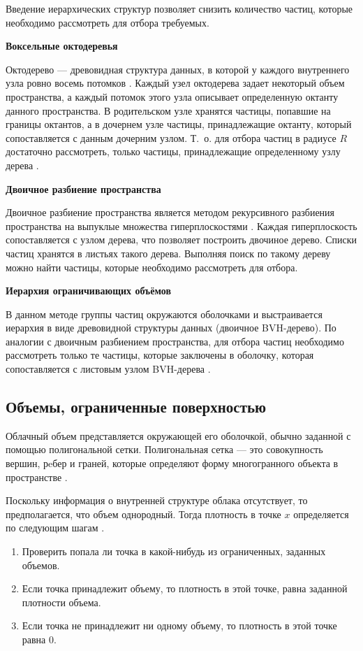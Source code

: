 Введение иерархических структур позволяет снизить количество частиц, которые необходимо рассмотреть для отбора требуемых.


\textbf{Воксельные октодеревья}

Октодерево --- древовидная структура данных, в которой у каждого внутреннего узла ровно восемь потомков \cite{octree}.
Каждый узел октодерева задает некоторый объем пространства, а каждый потомок этого узла описывает определенную октанту данного пространства. 
В родительском узле хранятся частицы, попавшие на границы октантов, а в дочернем узле частицы, принадлежащие октанту, который сопоставляется с данным дочерним узлом. Т.~о. для отбора частиц в радиусе $R$ достаточно рассмотреть, только частицы, принадлежащие определенному узлу дерева \cite{clouds}. 

\textbf{Двоичное разбиение пространства}

Двоичное разбиение пространства является методом рекурсивного разбиения пространства на выпуклые множества гиперплоскостями \cite{neighbours}. Каждая гиперплоскость сопоставляется с узлом дерева, что позволяет построить двочиное дерево. Списки частиц хранятся в листьях такого дерева. Выполняя поиск по такому дереву можно найти частицы, которые необходимо рассмотреть для отбора.

\textbf{Иерархия ограничивающих объёмов}

В данном методе группы частиц окружаются оболочками и выстраивается иерархия в виде древовидной структуры данных (двоичное BVH-дерево). По аналогии с двоичным разбиением пространства, для отбора частиц необходимо рассмотреть только те частицы, которые заключены в оболочку, которая сопоставляется с листовым узлом BVH-дерева \cite{clouds}.


\subsection{Объемы, ограниченные поверхностью} 
Облачный объем представляется окружающей его оболочкой, обычно заданной с помощью полигональной сетки. Полигональная сетка --- это совокупность вершин, рeбер и граней, которые определяют форму многогранного объекта в пространстве \cite{mesh}.

Поскольку информация о внутренней структуре облака отсутствует, то предполагается, что объем однородный. Тогда плотность в точке $x$ определяется по следующим шагам \cite{clouds}. 
\begin{enumerate}
	\item Проверить попала ли точка в какой-нибудь из ограниченных, заданных объемов.
	\item Если точка принадлежит объему, то плотность в этой точке, равна заданной плотности объема.
	\item Если точка не принадлежит ни одному объему, то плотность в этой точке равна 0.
\end{enumerate}

